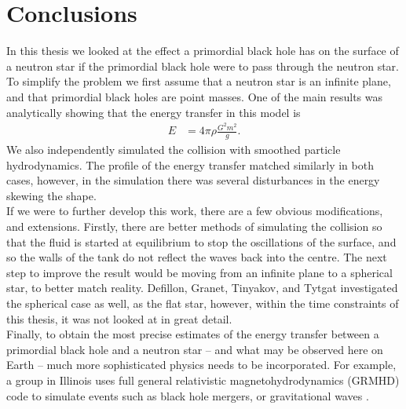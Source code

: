 \chapter{Conclusions}
\label{chap:conc}

In this thesis we looked at the effect a primordial black hole has on the surface of a neutron star if the primordial black hole were to pass through the neutron star. To simplify the problem we first assume that a neutron star is an infinite plane, and that primordial black holes are point masses. One of the main results was analytically showing that the energy transfer in this model is
\begin{align*}
E &= 4 \pi \rho \frac{G^2 m^2}{g}.
\end{align*}
We also independently simulated the collision with smoothed particle hydrodynamics. The profile of the energy transfer matched similarly in both cases, however, in the simulation there was several disturbances in the energy skewing the shape. \\

If we were to further develop this work, there are a few obvious modifications, and extensions. Firstly, there are better methods of simulating the collision so that the fluid is started at equilibrium to stop the oscillations of the surface, and so the walls of the tank do not reflect the waves back into the centre. The next step to improve the result would be moving from an infinite plane to a spherical star, to better match reality. Defillon, Granet, Tinyakov, and Tytgat \cite{tidalcapture} investigated the spherical case as well, as the flat star, however, within the time constraints of this thesis, it was not looked at in great detail. \\

Finally, to obtain the most precise estimates of the energy transfer between a primordial black hole and a neutron star -- and what may be observed here on Earth -- much more sophisticated physics needs to be incorporated. For example, a group in Illinois uses full general relativistic magnetohydrodynamics (GRMHD) code to simulate events such as black hole mergers, or gravitational waves \cite{nuts}.